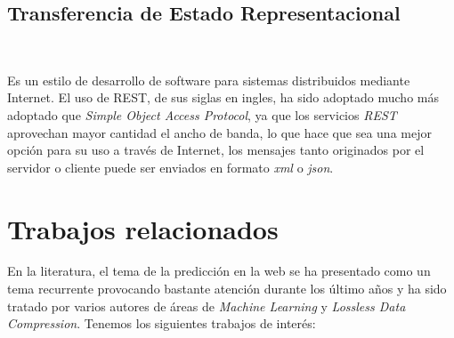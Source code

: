 \subsection{Transferencia de Estado Representacional}~\label{concept-rest}

Es un estilo de desarrollo de software para sistemas distribuidos mediante Internet. El uso de REST, de sus siglas en ingles, ha sido adoptado mucho más adoptado que  \emph{Simple Object Access Protocol}, ya que los servicios \emph{REST} aprovechan mayor cantidad el ancho de banda, lo que hace que sea una mejor opción para su uso a través de Internet, los mensajes tanto originados por el servidor o cliente puede ser enviados en formato \emph{xml} o \emph{json}. 



\section{Trabajos relacionados}

En la literatura, el tema de la predicción en la web se ha presentado como un tema recurrente provocando bastante atención durante los último años y ha sido tratado por varios autores de áreas de \emph{Machine Learning} y \emph{Lossless Data Compression}. Tenemos los siguientes trabajos de interés:





